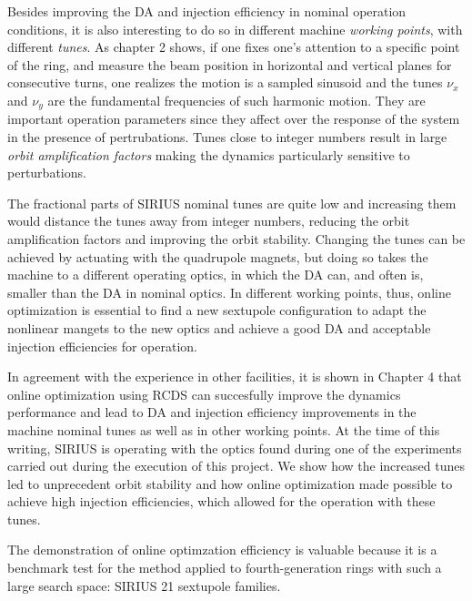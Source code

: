 Besides improving the DA and injection efficiency in nominal operation conditions, it is also interesting to do so in different machine \textit{working points}, with different \textit{tunes}. As chapter 2 shows, if one fixes one's attention to a specific point of the ring, and measure the beam position in horizontal and vertical planes for consecutive turns, one realizes the motion is a sampled sinusoid and the tunes $\nu_x$ and $\nu_y$ are the fundamental frequencies of such harmonic motion. They are important operation parameters  since they affect over the response of the system in the presence of pertrubations. Tunes close to integer numbers result in large \textit{orbit amplification factors} making the dynamics particularly sensitive to perturbations.

The fractional parts of SIRIUS nominal tunes are quite low and increasing them would distance the tunes away from integer numbers, reducing the orbit amplification factors and improving the orbit stability. Changing the tunes can be achieved by actuating with the quadrupole magnets, but doing so takes the machine to a different operating optics, in which the DA can, and often is, smaller than the DA in nominal optics. In different working points, thus, online optimization is essential to find a new sextupole configuration to adapt the nonlinear mangets to the new optics and  achieve a good DA and acceptable injection efficiencies for operation.

In agreement with the experience in other facilities, it is shown in Chapter 4 that online optimization using RCDS can succesfully improve the dynamics performance and lead to DA and injection efficiency improvements in the machine nominal tunes as well as in other working points. At the time of this writing, SIRIUS is operating with the optics found during one of the experiments carried out during the execution of this project. We show how the increased tunes led to unprecedent orbit stability and how online optimization made possible to achieve high injection efficiencies, which allowed for the operation with these tunes.

The demonstration of online optimzation efficiency is valuable because it is a benchmark test for the method applied to fourth-generation rings with such a large search space: SIRIUS 21 sextupole families.

